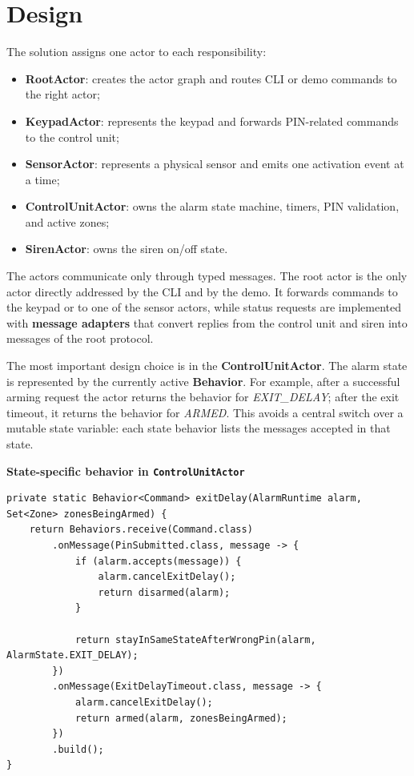 \section{Design}

The solution assigns one actor to each responsibility:
\begin{itemize}
    \item \textbf{RootActor}: creates the actor graph and routes CLI or demo commands to the right actor;
    \item \textbf{KeypadActor}: represents the keypad and forwards PIN-related commands to the control unit;
    \item \textbf{SensorActor}: represents a physical sensor and emits one activation event at a time;
    \item \textbf{ControlUnitActor}: owns the alarm state machine, timers, PIN validation, and active zones;
    \item \textbf{SirenActor}: owns the siren on/off state.
\end{itemize}

The actors communicate only through typed messages.
The root actor is the only actor directly addressed by the CLI and by the demo.
It forwards commands to the keypad or to one of the sensor actors, while status requests are implemented with
\textbf{message adapters} that convert replies from the control unit and siren into messages of the root protocol.

The most important design choice is in the \textbf{ControlUnitActor}.
The alarm state is represented by the currently active \textbf{Behavior}.
For example, after a successful arming request the actor returns the behavior for \textit{EXIT\_DELAY}; after the exit
timeout, it returns the behavior for \textit{ARMED}.
This avoids a central switch over a mutable state variable: each state behavior lists the messages accepted in that
state.

\medskip

\noindent\textbf{State-specific behavior in \texttt{ControlUnitActor}}
\begin{lstlisting}[style=reportcode]
private static Behavior<Command> exitDelay(AlarmRuntime alarm, Set<Zone> zonesBeingArmed) {
    return Behaviors.receive(Command.class)
        .onMessage(PinSubmitted.class, message -> {
            if (alarm.accepts(message)) {
                alarm.cancelExitDelay();
                return disarmed(alarm);
            }

            return stayInSameStateAfterWrongPin(alarm, AlarmState.EXIT_DELAY);
        })
        .onMessage(ExitDelayTimeout.class, message -> {
            alarm.cancelExitDelay();
            return armed(alarm, zonesBeingArmed);
        })
        .build();
}
\end{lstlisting}

